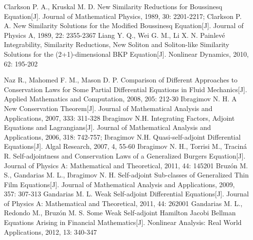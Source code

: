 \begin{thebibliography}{0}
 Clarkson P. A., Kruskal M. D. New Similarity Reductions for Boussinesq Equation[J]. Journal of Mathematical Physics, 1989, 30: 2201-2217;
   Clarkson  P. A. New Similarity Solutions for the Modified Boussinesq Equation[J]. Journal of Physics A, 1989, 22: 2355-2367
 Liang Y. Q., Wei G. M., Li X. N. Painlev\'{e} Integrability, Similarity Reductions, New Soliton and Soliton-like Similarity Solutions for the (2+1)-dimensional BKP Equation[J]. Nonlinear Dynamics, 2010, 62: 195-202%


 Naz R., Mahomed F. M., Mason D. P. Comparison of Different Approaches to Conservation Laws for Some Partial Differential Equations in Fluid Mechanics[J]. Applied Mathematics and Computation, 2008, 205: 212-30
 Ibragimov N. H. A New Conservation Theorem[J]. Journal of Mathematical Analysis and Applications, 2007, 333: 311-328
 Ibragimov N.H. Integrating Factors, Adjoint Equations and Lagrangians[J]. Journal of Mathematical Analysis and Applications, 2006, 318: 742-757; Ibragimov N.H. Quasi-self-adjoint Differential Equations[J]. Algal Research, 2007, 4, 55-60%
 Ibragimov N. H., Torrisi M., Tracin\'{a} R. Self-adjointness and Conservation Laws of a Generalized Burgers Equation[J]. Journal of Physics A: Mathematical and Theoretical, 2011, 44: 145201
 Bruz\'{o}n M. S., Gandarias M. L., Ibragimov N. H. Self-adjoint Sub-classes of Generalized Thin Film Equations[J]. Journal of Mathematical  Analysis and Applications, 2009, 357: 307-313
 Gandarias M. L. Weak Self-adjoint Differential Equations[J]. Journal of Physics A: Mathematical and Theoretical, 2011, 44: 262001
 Gandarias M. L., Redondo M., Bruz\'{o}n M. S. Some Weak Self-adjoint Hamilton Jacobi Bellman Equations Arising in Financial Mathematics[J]. Nonlinear Analysis: Real World Applications, 2012, 13: 340-347

\end{thebibliography}
\cleardoublepage
